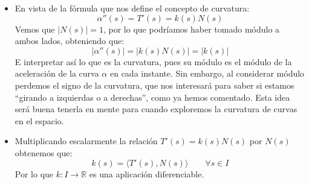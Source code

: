 \begin{observacion}
\begin{itemize}
            Si por el contrario estamos ``girando el volante a la izquierda'', vemos que tenemos entonces que la aceleración centrípeta sí que lleva la misma dirección y sentido que el vector normal $N(s)$, por lo que en dicho caso tenemos una curvatura positiva, $k(s)>0$. 

            Así, el caso $k(s) = 0$ corresponde con una aceleración igual a cero, por lo que la curva no presenta variación de la velocidad en dicho punto, algo que podemos interpretar como que la curva no presenta curvatura en dicho instante, pues la traza simplemente sigue la velocidad del vector velocidad, que en dicho instante presenta derivada nula.
        \item En vista de la fórmula que nos define el concepto de curvatura:
            \begin{equation*}
                \alpha''(s) = T'(s) = k(s)N(s) 
            \end{equation*}
            Vemos que $|N(s)| = 1$, por lo que podríamos haber tomado módulo a ambos lados, obteniendo que:
            \begin{equation*}
                |\alpha''(s)| = |k(s)N(s)| = |k(s)|
            \end{equation*}
            E interpretar así lo que es la curvatura, pues su módulo es el módulo de la aceleración de la curva $\alpha$ en cada instante. Sin embargo, al considerar módulo perdemos el signo de la curvatura, que nos interesará para saber si estamos ``girando a izquierdas o a derechas'', como ya hemos comentado. Esta idea será buena tenerla en mente para cuando exploremos la curvatura de curvas en el espacio.
        \item Multiplicando escalarmente la relación $T'(s) = k(s)N(s)$ por $N(s)$ obtenemos que:
            \begin{equation*}
                k(s) = \langle T'(s),N(s) \rangle  \qquad \forall s\in I
            \end{equation*}
            Por lo que $k:I\to\mathbb{R}$ es una aplicación diferenciable.
    \end{itemize}
\end{observacion}


